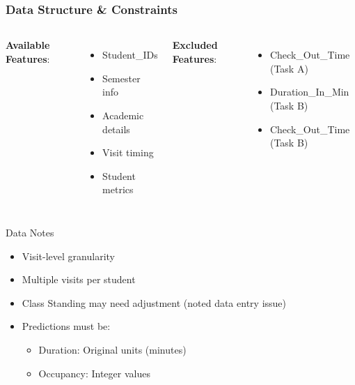 \documentclass{beamer}
\begin{document}
\begin{frame}
\frametitle{Data Structure \& Constraints}
    \begin{columns}
        \textbf{Available Features}:
            \begin{itemize}
            \item Student\_IDs
            \item Semester info
            \item Academic details
            \item Visit timing
            \item Student metrics
            \end{itemize}
            
        \textbf{Excluded Features}:
            \begin{itemize}
            \item Check\_Out\_Time (Task A)
            \item Duration\_In\_Min (Task B)
            \item Check\_Out\_Time (Task B)
            \end{itemize}
    \end{columns}

    \begin{block}{Data Notes}
        \begin{itemize}
        \item Visit-level granularity
        \item Multiple visits per student
        \item Class Standing may need adjustment (noted data entry issue)
        \item Predictions must be:
            \begin{itemize}
            \item Duration: Original units (minutes)
            \item Occupancy: Integer values
            \end{itemize}
        \end{itemize}
    \end{block}
\end{frame}
\end{document}
